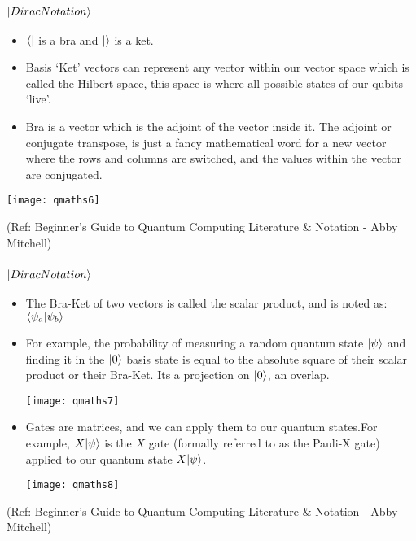  \begin{frame}[fragile]\frametitle{$|{Dirac Notation}\rangle $}
\begin{itemize}
\item $ \langle{}| $ is a bra and $|{}\rangle $ is a ket.
\item Basis ‘Ket’ vectors can represent any vector within our vector space which is called the Hilbert space, this space is where all possible states of our qubits ‘live’.
\item Bra is a vector which is the adjoint of the vector inside it. The adjoint or conjugate transpose, is just a fancy mathematical word for a new vector where the rows and columns are switched, and the values within the vector are conjugated.
\end{itemize}

\begin{center}
\texttt{[image: qmaths6]}
\end{center}



\tiny{(Ref: Beginner’s Guide to Quantum Computing Literature \& Notation - Abby Mitchell)}

\end{frame}

 \begin{frame}[fragile]\frametitle{$|{Dirac Notation}\rangle $}
\begin{itemize}
\item The Bra-Ket of two vectors is called the scalar product, and is noted as: $\langle{\psi_a}|{\psi_b}\rangle$

\item For example, the probability of measuring a random quantum state $|{\psi}\rangle $ and finding it in the $|{0}\rangle $  basis state is equal to the absolute square of their scalar product or their Bra-Ket. Its a projection on $|{0}\rangle $, an overlap.

\begin{center}
\texttt{[image: qmaths7]}
\end{center}

\item Gates are matrices, and we can apply them to our quantum states.For example, $X |{\psi}\rangle $ is the $X$ gate (formally referred to as the Pauli-X gate) applied to our quantum state $X |{\psi}\rangle $. 

\begin{center}
\texttt{[image: qmaths8]}
\end{center}

\end{itemize}




\tiny{(Ref: Beginner’s Guide to Quantum Computing Literature \& Notation - Abby Mitchell)}

\end{frame}

